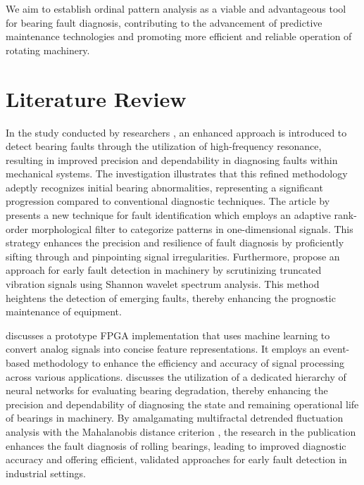 \documentclass[sn-basic,pdflatex]{sn-jnl}
\theoremstyle{remark}
\theoremstyle{definition}
\begin{document}
We aim to establish ordinal pattern analysis as a viable and
advantageous tool for bearing fault diagnosis, contributing to the
advancement of predictive maintenance technologies and promoting more
efficient and reliable operation of rotating machinery.

\section{Literature Review}\label{sec2}

In the study conducted by researchers \citet{WOS:000312724900101}, an
enhanced approach is introduced to detect bearing faults through the
utilization of high-frequency resonance, resulting in improved precision
and dependability in diagnosing faults within mechanical systems. The
investigation illustrates that this refined methodology adeptly
recognizes initial bearing abnormalities, representing a significant
progression compared to conventional diagnostic techniques. The article
by \citet{WOS:000301688000008} presents a new technique for fault
identification which employs an adaptive rank-order morphological filter
to categorize patterns in one-dimensional signals. This strategy
enhances the precision and resilience of fault diagnosis by proficiently
sifting through and pinpointing signal irregularities. Furthermore,
\citet{WOS:000303039300034} propose an approach for early fault
detection in machinery by scrutinizing truncated vibration signals using
Shannon wavelet spectrum analysis. This method heightens the detection
of emerging faults, thereby enhancing the prognostic maintenance of
equipment.

\citet{WOS:000345844100102} discusses a prototype FPGA implementation
that uses machine learning to convert analog signals into concise
feature representations. It employs an event-based methodology to
enhance the efficiency and accuracy of signal processing across various
applications. \citet{WOS:000396580800080} discusses the utilization of a
dedicated hierarchy of neural networks for evaluating bearing
degradation, thereby enhancing the precision and dependability of
diagnosing the state and remaining operational life of bearings in
machinery. By amalgamating multifractal detrended fluctuation analysis
with the Mahalanobis distance criterion \citep{WOS:000320835800016}, the
research in the publication enhances the fault diagnosis of rolling
bearings, leading to improved diagnostic accuracy and offering
efficient, validated approaches for early fault detection in industrial
settings.
\end{document}
